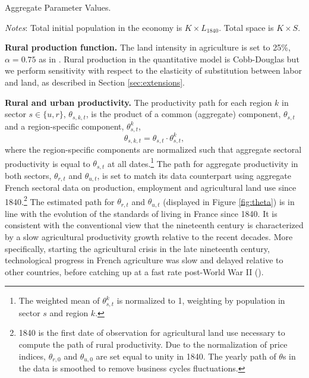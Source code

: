 \documentclass[./20250130-paper.tex]{subfiles}
\begin{document}

\begin{table}[h]
	\begin{center}
	\end{center}
	\caption{Aggregate Parameter Values.\label{tab:params}}
	{\footnotesize \textit{Notes}: Total initial population in the economy is $K \times L_{1840}$. Total space is $K \times S$.}
\end{table}

\textbf{Rural production function.} The land intensity in agriculture is set to 25\%, $\alpha=0.75$ as in \cite{boppart2019}. Rural production in the quantitative model is Cobb-Douglas but we perform sensitivity with respect to the elasticity of substitution between labor and land, as described in Section \ref{sec:extensions}.

\textbf{Rural and urban productivity.} The productivity path for each region $k$ in sector $s \in \{u,r\}$, $\theta_{s,k,t}$, is the product of a common (aggregate) component, $\theta_{s,t}$ and a region-specific component, $\theta^k_{s,t}$,
\begin{equation}
	\theta_{s,k,t}=\theta_{s,t} \cdot \theta^k_{s,t},\label{eq:theta-definition}
\end{equation}   
where the region-specific components are normalized such that aggregate sectoral productivity is equal to $\theta_{s,t}$ at all dates.\footnote{The weighted mean of $\theta^k_{s,t}$ is normalized to 1, weighting by population in sector $s$ and region $k$.} The path for aggregate productivity in both sectors, $\theta_{r,t}$ and  $\theta_{u,t}$, is set to match its data counterpart using aggregate French sectoral data on production, employment and agricultural land use since 1840.\footnote{1840 is the first date of observation for agricultural land use necessary to compute the path of rural productivity. Due to the normalization of price indices, $\theta_{r,0}$ and $\theta_{u,0}$ are set equal to unity in 1840. The yearly path of $\theta$s in the data is smoothed to remove business cycles fluctuations.} The estimated path for $\theta_{r,t}$ and  $\theta_{u,t}$ (displayed in Figure \ref{fig:theta}) is in line with the evolution of the standards of living in France since 1840. It is consistent with the conventional view that the nineteenth century is characterized by a slow agricultural productivity growth relative to the recent decades. More specifically, starting the agricultural crisis in the late nineteenth century, technological progress in French agriculture was slow and delayed relative to other countries, before catching up at a fast rate post-World War II (\cite{bairoch1989}).
\end{document}

